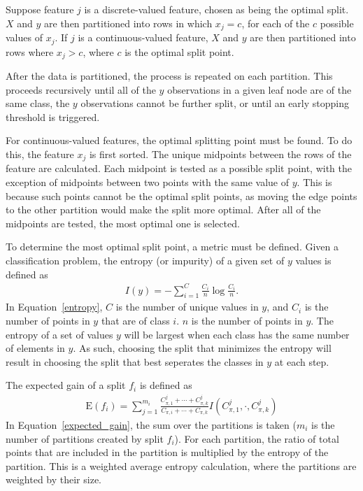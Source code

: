 \documentclass{amsart}
\begin{document}
    Suppose feature $j$ is a discrete-valued feature, chosen as being the optimal split.
    $X$ and $y$ are then partitioned into rows in which $x_j = c$, for each of the $c$ possible values of
    $x_j$. If $j$ is a continuous-valued feature, $X$ and $y$ are then partitioned into rows
    where $x_j > c$, where $c$ is the optimal split point.

    After the data is partitioned, the process is repeated on each partition. This proceeds recursively
    until all of the $y$ observations in a given leaf node are of the same class, the $y$
    observations cannot be further split, or until an early stopping threshold is triggered.

    For continuous-valued features, the optimal splitting point must be found.
    To do this, the feature $x_j$ is first sorted. The unique midpoints between the
    rows of the feature are calculated. Each midpoint is tested as a possible split point,
    with the exception of midpoints between two points with the same value of $y$. This
    is because such points cannot be the optimal split points, as moving the edge points
    to the other partition would make the split more optimal. After all of the midpoints are tested,
    the most optimal one is selected.

    To determine the most optimal split point, a metric must be defined. Given a classification
    problem, the entropy (or impurity) of a given set of $y$ values is defined as
    \begin{align}
        I(y) = -\sum_{i=1}^{C} \frac{C_i}{n} \log \frac{C_i}{n}.
    \label{entropy}
    \end{align}
    In Equation~\ref{entropy}, $C$ is the number of unique values in $y$, and $C_i$ is the number
    of points in $y$ that are of class $i$. $n$ is the number of points in $y$. The entropy of a
    set of values $y$ will be largest when each class has the same number of elements in $y$.
    As such, choosing the split that minimizes the entropy will result in choosing the split
    that best seperates the classes in $y$ at each step.

    The expected gain of a split $f_i$ is defined as
    \begin{align}
        \textrm{E}(f_i) = \sum_{j=1}^{m_i}
        \frac{C_{\pi, 1}^j + \cdots + C_{\pi, k}^j}
        {C_{\pi, i} + \cdots + C_{\pi, k}} I(C_{\pi, 1}^j, \cdot, C_{\pi, k}^j)
        \label{expected_gain}
    \end{align}
    In Equation~\ref{expected_gain}, the sum over the partitions is taken ($m_i$ is
    the number of partitions created by split $f_i$).
    For each partition,
    the ratio of total points that are included in the partition is multiplied by the
    entropy of the partition. This is a weighted average entropy calculation, where the partitions
    are weighted by their size.
\end{document}
